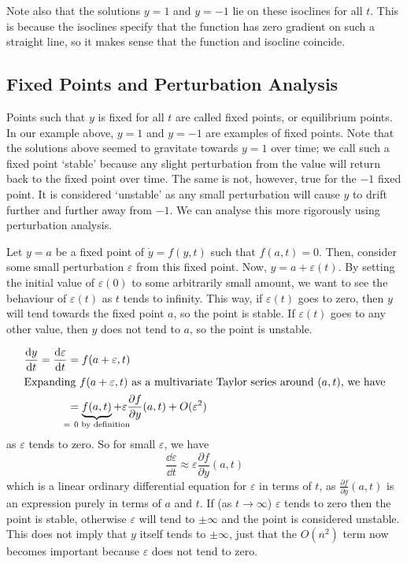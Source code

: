 Note also that the solutions \(y = 1\) and \(y = -1\) lie on these isoclines for all \(t\). This is because the isoclines specify that the function has zero gradient on such a straight line, so it makes sense that the function and isocline coincide.

\subsection{Fixed Points and Perturbation Analysis}
Points such that \(y\) is fixed for all \(t\) are called fixed points, or equilibrium points. In our example above, \(y=1\) and \(y=-1\) are examples of fixed points. Note that the solutions above seemed to gravitate towards \(y=1\) over time; we call such a fixed point `stable' because any slight perturbation from the value will return back to the fixed point over time. The same is not, however, true for the \(-1\) fixed point. It is considered `unstable' as any small perturbation will cause \(y\) to drift further and further away from \(-1\). We can analyse this more rigorously using perturbation analysis.

Let \(y = a\) be a fixed point of \(\dot y = f(y, t)\) such that \(f(a, t) = 0\). Then, consider some small perturbation \(\varepsilon\) from this fixed point. Now, \(y = a + \varepsilon(t)\). By setting the initial value of \(\varepsilon(0)\) to some arbitrarily small amount, we want to see the behaviour of \(\varepsilon(t)\) as \(t\) tends to infinity. This way, if \(\varepsilon(t)\) goes to zero, then \(y\) will tend towards the fixed point \(a\), so the point is stable. If \(\varepsilon(t)\) goes to any other value, then \(y\) does not tend to \(a\), so the point is unstable.

\begin{align*}
	\frac{\dd{y}}{\dd{t}} = \frac{\dd \varepsilon}{\dd{t}} & = f(a + \varepsilon, t)                                                                                                            \\
	\intertext{Expanding \(f(a + \varepsilon, t)\) as a multivariate Taylor series around \((a, t)\), we have}
	                                                       & = \underbrace{f(a, t)}_{\mathclap{=\ 0\text{ by definition}}} + \varepsilon \frac{\partial f}{\partial y}(a, t) + O(\varepsilon^2)
\end{align*}
as \(\varepsilon\) tends to zero. So for small \(\varepsilon\), we have
\[ \frac{\dd \varepsilon}{\dd{t}} \approx \varepsilon \frac{\partial f}{\partial y}(a, t) \]
which is a linear ordinary differential equation for \(\varepsilon\) in terms of \(t\), as \(\frac{\partial f}{\partial y}(a, t)\) is an expression purely in terms of \(a\) and \(t\). If (as \(t \to \infty\)) \(\varepsilon\) tends to zero then the point is stable, otherwise \(\varepsilon\) will tend to \(\pm \infty\) and the point is considered unstable. This does not imply that \(y\) itself tends to \(\pm \infty\), just that the \(O(n^2)\) term now becomes important because \(\varepsilon\) does not tend to zero.


